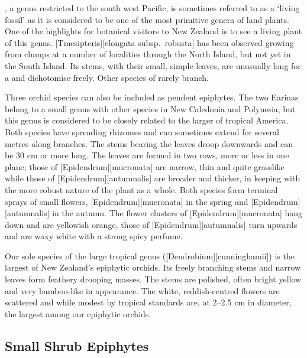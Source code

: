 , a genus restricted to the south west Pacific, is sometimes referred to as a `living fossil' as it is considered to be one of the most primitive genera of land plants.
One of the highlights for botanical visitors to New Zealand is to see a living plant of this genus. [Tmesipteris][elongata subsp.\ robusta] has been observed growing from  clumps at a number of localities through the North Island, but not yet in the South Island.
Its stems, with their small, simple leaves, are unusually long for a  and dichotomise freely.
Other species of  rarely branch.

Three orchid species can also be included as pendent epiphytes.
The two Earinas belong to a small genus with other species in New Caledonia and Polynesia, but this genus is considered to be closely related to the larger  of tropical America.
Both species have spreading rhizomes and can sometimes extend for several metres along branches.
The stems bearing the leaves droop downwards and can be 30 cm or more long.
The leaves are formed in two rows, more or less in one plane; those of [Epidendrum][mucronata] are narrow, thin and quite grasslike while those of [Epidendrum][autumnalis] are broader and thicker, in keeping with the more robust nature of the plant as a whole.
Both species form terminal sprays of small flowers, [Epidendrum][mucronata] in the spring and [Epidendrum][autumnalis] in the autumn.
The flower clusters of [Epidendrum][mucronata] hang down and are yellowish orange, those of [Epidendrum][autumnalis] turn upwards and are waxy white with a strong spicy perfume.

Our sole species of the large tropical genus  ([Dendrobium][cunninghamii]) is the largest of New Zealand's epiphytic orchids.
Its freely branching stems and narrow leaves form feathery drooping masses.
The stems are polished, often bright yellow and very bamboo-like in appearance.
The white, reddish-centred flowers are scattered and while modest by tropical standards are, at 2--2.5 cm in diameter, the largest among our epiphytic orchids.

\subsection{Small Shrub Epiphytes}


